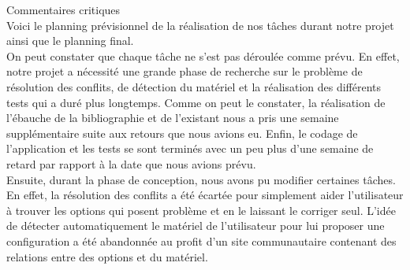 \documentclass[17pts]{report}
\begin{document}
\newpage
Commentaires critiques\\

    Voici le planning prévisionnel de la réalisation de nos tâches durant notre
    projet ainsi que le planning final.  \\

    On peut constater que chaque tâche ne s'est pas déroulée comme prévu.  En
    effet, notre projet a nécessité une grande phase de recherche sur le
    problème de résolution des conflits, de détection du matériel et la
    réalisation des différents tests qui a duré plus longtemps.  Comme on peut
    le constater, la réalisation de l'ébauche de la bibliographie et de
    l'existant nous a pris une semaine supplémentaire suite aux retours que
    nous avions eu. Enfin, le codage de l'application et les tests se sont
    terminés avec un peu plus d'une semaine de retard par rapport à la date que
    nous avions prévu.  \\

    Ensuite, durant la phase de conception, nous avons pu modifier certaines
    tâches. En effet, la résolution des conflits a été écartée pour simplement
    aider l'utilisateur à trouver les options qui posent problème et en le
    laissant le corriger seul. L'idée de détecter automatiquement le matériel
    de l'utilisateur pour lui proposer une configuration a été abandonnée au
    profit d'un site communautaire contenant des relations entre des options et
    du matériel.
\end{document}
